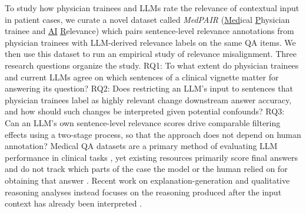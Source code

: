 \documentclass[fleqn,10pt]{wlscirep}
\begin{document}
To study how physician trainees and LLMs rate the relevance of contextual input in patient cases, we curate a novel dataset called \emph{MedPAIR} (\underline{Med}ical \underline{P}hysician trainee and \underline{AI} \underline{R}elevance) which pairs sentence-level relevance annotations from physician trainees with LLM-derived relevance labels on the same QA items. We then use this dataset to run an empirical study of relevance misalignment. Three research questions organize the study. RQ1: To what extent do physician trainees and current LLMs agree on which sentences of a clinical vignette matter for answering its question? RQ2: Does restricting an LLM's input to sentences that physician trainees label as highly relevant change downstream answer accuracy, and how should such changes be interpreted given potential confounds? RQ3: Can an LLM's own sentence-level relevance scores drive comparable filtering effects using a two-stage process, so that the approach does not depend on human annotation? Medical QA datasets are a primary method of evaluating LLM performance in clinical tasks \cite{pal_medmcqa_2022, zhang_survey_2024, jin_rjua-meddqa_2024, soni_radqa_2022}, yet existing resources primarily score final answers and do not track which parts of the case the model or the human relied on for obtaining that answer \cite{toma_clinical_2023, adlakha_evaluating_2024, bedi2026medhelm}. Recent work on explanation-generation and qualitative reasoning analyses instead focuses on the reasoning produced after the input context has already been interpreted \cite{khandekar2024medcalc}.
\end{document}
